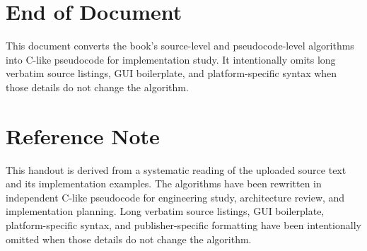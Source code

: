 \documentclass[10pt,letterpaper]{article}
\begin{document}
\section{End of Document}

This document converts the book's source-level and pseudocode-level algorithms into C-like pseudocode for implementation study. It intentionally omits long verbatim source listings, GUI boilerplate, and platform-specific syntax when those details do not change the algorithm.

\clearpage
\section*{Reference Note}
This handout is derived from a systematic reading of the uploaded source text and its implementation examples. The algorithms have been rewritten in independent C-like pseudocode for engineering study, architecture review, and implementation planning. Long verbatim source listings, GUI boilerplate, platform-specific syntax, and publisher-specific formatting have been intentionally omitted when those details do not change the algorithm.
\end{document}
